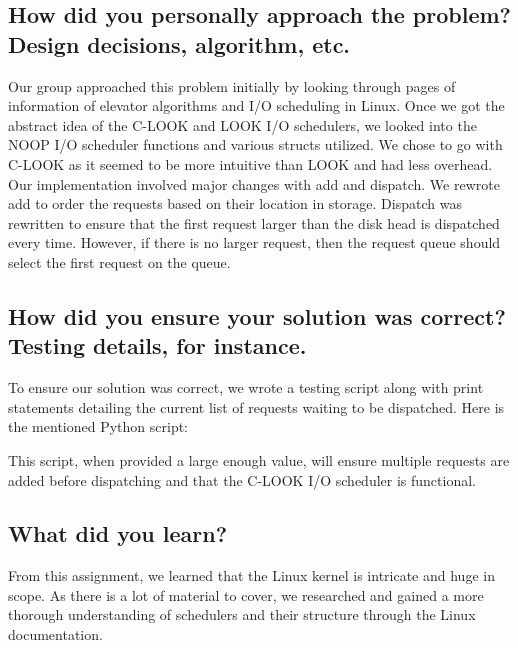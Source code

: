 \documentclass[draftclsnofoot, onecolumn]{IEEEtran}
\begin{document}
\subsection{How did you personally approach the problem? Design decisions, algorithm, etc.}
Our group approached this problem initially by looking through pages of information of elevator algorithms and I/O scheduling in Linux. Once we got the abstract idea of the C-LOOK and LOOK I/O schedulers, we looked into the NOOP I/O scheduler functions and various structs utilized. We chose to go with C-LOOK as it seemed to be more intuitive than LOOK and had less overhead. Our implementation involved major changes with add and dispatch. We rewrote add to order the requests based on their location in storage. Dispatch was rewritten to ensure that the first request larger than the disk head is dispatched every time. However, if there is no larger request, then the request queue should select the first request on the queue.

\subsection{How did you ensure your solution was correct? Testing details, for instance.}
To ensure our solution was correct, we wrote a testing script along with print statements detailing the current list of requests waiting to be dispatched. Here is the mentioned Python script:

\begin{center}

\end{center}
This script, when provided a large enough value, will ensure multiple requests are added before dispatching and that the C-LOOK I/O scheduler is functional.
\subsection{What did you learn?}
From this assignment, we learned that the Linux kernel is intricate and huge in scope. As there is a lot of material to cover, we researched and gained a more thorough understanding of schedulers and their structure through the Linux documentation.
\end{document}
